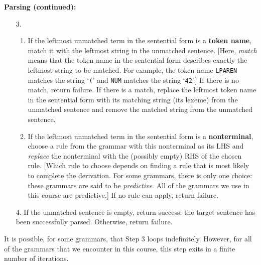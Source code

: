\begin{minipage}[t]{\sw}
\slidenumber
\LARGE
{\bf Parsing (continued):}
\begin{enumerate}
\itemsep -0.5ex
\item [3.]
  \begin{enumerate}
  \item
    If the leftmost unmatched term in the sentential form is a {\bf token name},
    match it with the leftmost string in the unmatched sentence.
    [Here, {\em match} means that the token name
    in the sentential form describes exactly
    the leftmost string to be matched.
    For example, the token name {\tt LPAREN} matches the string `\verb'(''
    and {\tt NUM} matches the string `\verb'42''.]
    If there is no match, return failure.
    If there is a match, replace the leftmost token name in the
    sentential form with its matching string (its lexeme)
    from the unmatched sentence
    and remove the matched string from the unmatched sentence.
  \item
    If the leftmost unmatched term
    in the sentential form is a {\bf nonterminal},
    choose a rule from the grammar with this nonterminal as its LHS
    and {\em replace} the nonterminal with the (possibly empty) RHS
    of the chosen rule.
    [Which rule to choose depends on
    finding a rule that is most likely to complete the derivation.
    For some grammars, there is only one choice: these grammars
    are said to be {\em predictive}.  All of the grammars we
    use in this course are predictive.]
    If no rule can apply, return failure.
  \end{enumerate}
\item [4.]
  If the unmatched sentence is empty, return success:
  the target sentence has been successfully parsed.
  Otherwise, return failure.
\end{enumerate}
It is possible, for some grammars, that Step 3 loops indefinitely.
However, for all of the grammars that we encounter in this course,
this step exits in a finite number of iterations.
\end{minipage}
\clearpage
